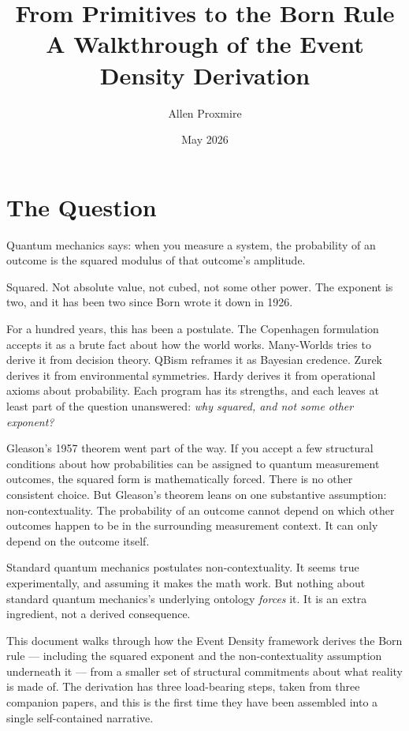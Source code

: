 \documentclass[11pt,a4paper]{article}
\title{\vspace{-1cm}\Large\bfseries From Primitives to the Born Rule\\[6pt]
\large\mdseries A Walkthrough of the Event Density Derivation}
\author{Allen Proxmire}
\date{May 2026}
\begin{document}
\maketitle
\thispagestyle{empty}

\section{The Question}

Quantum mechanics says: when you measure a system, the probability of an outcome is the squared modulus of that outcome's amplitude.

Squared. Not absolute value, not cubed, not some other power. The exponent is two, and it has been two since Born wrote it down in 1926.

For a hundred years, this has been a postulate. The Copenhagen formulation accepts it as a brute fact about how the world works. Many-Worlds tries to derive it from decision theory. QBism reframes it as Bayesian credence. Zurek derives it from environmental symmetries. Hardy derives it from operational axioms about probability. Each program has its strengths, and each leaves at least part of the question unanswered: \emph{why squared, and not some other exponent?}

Gleason's 1957 theorem went part of the way. If you accept a few structural conditions about how probabilities can be assigned to quantum measurement outcomes, the squared form is mathematically forced. There is no other consistent choice. But Gleason's theorem leans on one substantive assumption: non-contextuality. The probability of an outcome cannot depend on which other outcomes happen to be in the surrounding measurement context. It can only depend on the outcome itself.

Standard quantum mechanics postulates non-contextuality. It seems true experimentally, and assuming it makes the math work. But nothing about standard quantum mechanics's underlying ontology \emph{forces} it. It is an extra ingredient, not a derived consequence.

This document walks through how the Event Density framework derives the Born rule --- including the squared exponent and the non-contextuality assumption underneath it --- from a smaller set of structural commitments about what reality is made of. The derivation has three load-bearing steps, taken from three companion papers, and this is the first time they have been assembled into a single self-contained narrative.
\end{document}
